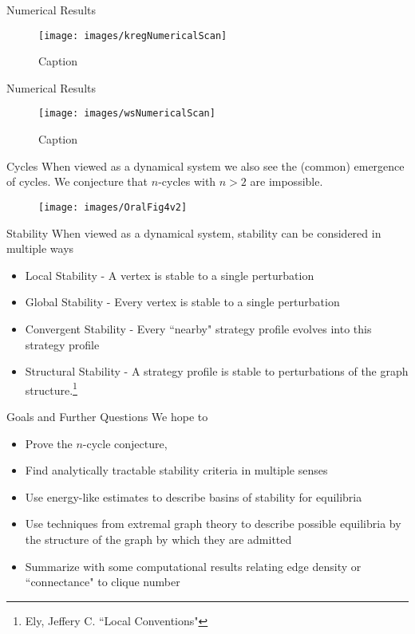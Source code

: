 \documentclass{beamer}
\begin{document}
\begin{frame}{Numerical Results}
	\begin{figure}
		\texttt{[image: images/kregNumericalScan]}
		\caption{Caption}
	\end{figure}
\end{frame}

\begin{frame}{Numerical Results}
	\begin{figure}
		\texttt{[image: images/wsNumericalScan]}
		\caption{Caption}
	\end{figure}
\end{frame}

\begin{frame}{Cycles}
	When viewed as a dynamical system we also see the (common) emergence of cycles. We conjecture that $n$-cycles with $n>2$ are impossible. 
	\begin{figure}
		\texttt{[image: images/OralFig4v2]}
	\end{figure} 
\end{frame}

\begin{frame}{Stability}
	When viewed as a dynamical system, stability can be considered in multiple ways 
	\begin{itemize}
		\item Local Stability - A vertex is stable to a single perturbation
		\item Global Stability - Every vertex is stable to a single perturbation
		\item Convergent Stability - Every ``nearby" strategy profile evolves into this strategy profile
		\item Structural Stability - A strategy profile is stable to perturbations of the graph structure.\footnote{Ely, Jeffery C. ``Local Conventions"}
	\end{itemize}
\end{frame}

\begin{frame}{Goals and Further Questions}
	We hope to 
	\begin{itemize}
		\item Prove the $n$-cycle conjecture,
		\item Find analytically tractable stability criteria in multiple senses
		\item Use energy-like estimates to describe basins of stability for equilibria
		\item Use techniques from extremal graph theory to describe possible equilibria by the structure of the graph by which they are admitted
		\item Summarize with some computational results relating edge density or ``connectance" to clique number 
	\end{itemize}
\end{frame}
\end{document}
